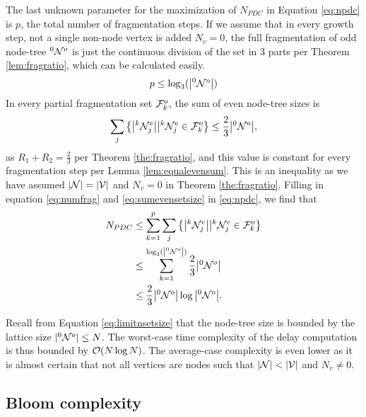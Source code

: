 

The last unknown parameter for the maximization of $N_{PDC}$ in Equation \eqref{eq:npdc} is $p$, the total number of fragmentation steps. If we assume that in every growth step, not a single non-node vertex is added $N_v = 0$, the full fragmentation of odd node-tree ${}^{0}\mathcal{N}^o$ is just the continuous division of the set in 3 parts per Theorem \ref{lem:fragratio}, which can be calculated easily.
\begin{equation}\label{eq:numfrag}
  p \leq \log_3(\abs{{}^{0}\mathcal{N}^o})
\end{equation}
In every partial fragmentation set $\mathcal{F}^o_k$, the sum of even node-tree sizes is 
\begin{equation}\label{eq:sumevensetsize}
  \sum_j \left\{ \abs{{}^{k}\mathcal{N}_j^e} \big| {}^{k}\mathcal{N}_j^e \in \mathcal{F}^o_k \right\} \leq \frac{2}{3}\abs{{}^{0}\mathcal{N}^o},
\end{equation}
as $R_1+R_2 = \frac{2}{3}$ per Theorem \ref{the:fragratio}, and this value is constant for every fragmentation step per Lemma \ref{lem:equalevensum}. This is an inequality as we have assumed $|\mathcal{N}| = |\mathcal{V}|$ and $N_v=0$ in Theorem \ref{the:fragratio}. Filling in equation \eqref{eq:numfrag} and \eqref{eq:sumevensetsize} in \eqref{eq:npdc}, we find that
\begin{align}
\nonumber N_{PDC}  &\leq \sum_{k=1}^{p} \sum_j \left\{ \abs{{}^{k}\mathcal{N}_j^e} \big| {}^{k}\mathcal{N}_j^e \in \mathcal{F}^o_k \right\}  \\
\nonumber          &\leq \sum_{k=1}^{\log_3(\abs{{}^{0}\mathcal{N}^o})} \frac{2}{3}\abs{{}^{0}\mathcal{N}^o} \\
                  &\leq \frac{2}{3}\abs{{}^{0}\mathcal{N}^o}\log{\abs{ {}^{0} \mathcal{N}^o}}.
\end{align}

Recall from Equation \eqref{eq:limitnsetsize} that the node-tree size is bounded by the lattice size $|{}^{0}\mathcal{N}^o| \leq N$. The worst-case time complexity of the delay computation is thus bounded by $\mathcal{O}(N\log{N})$. The average-case complexity is even lower as it is almost certain that not all vertices are nodes such that $|\mathcal{N}| < |\mathcal{V}|$ and $N_v \neq 0$.

\subsection{Bloom complexity}\label{sec:bloomcomplexity}

